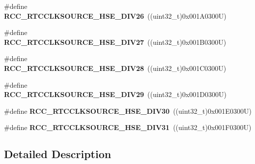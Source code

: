 \begin{DoxyCompactItemize}
\#define {\bfseries R\+C\+C\+\_\+\+R\+T\+C\+C\+L\+K\+S\+O\+U\+R\+C\+E\+\_\+\+H\+S\+E\+\_\+\+D\+I\+V26}~((uint32\+\_\+t)0x001\+A0300\+U)
\item 
\mbox{\label{group___r_c_c___r_t_c___clock___source_ga65afd29f069e2e9b607212876d7860e5}} 
\#define {\bfseries R\+C\+C\+\_\+\+R\+T\+C\+C\+L\+K\+S\+O\+U\+R\+C\+E\+\_\+\+H\+S\+E\+\_\+\+D\+I\+V27}~((uint32\+\_\+t)0x001\+B0300\+U)
\item 
\mbox{\label{group___r_c_c___r_t_c___clock___source_ga28e7a9291c903b820991c3a3e80c9ae1}} 
\#define {\bfseries R\+C\+C\+\_\+\+R\+T\+C\+C\+L\+K\+S\+O\+U\+R\+C\+E\+\_\+\+H\+S\+E\+\_\+\+D\+I\+V28}~((uint32\+\_\+t)0x001\+C0300\+U)
\item 
\mbox{\label{group___r_c_c___r_t_c___clock___source_gac22536498ea83e12ecd83f04d5e98858}} 
\#define {\bfseries R\+C\+C\+\_\+\+R\+T\+C\+C\+L\+K\+S\+O\+U\+R\+C\+E\+\_\+\+H\+S\+E\+\_\+\+D\+I\+V29}~((uint32\+\_\+t)0x001\+D0300\+U)
\item 
\mbox{\label{group___r_c_c___r_t_c___clock___source_ga5849760bab0f4057bd254cd022dc1a7a}} 
\#define {\bfseries R\+C\+C\+\_\+\+R\+T\+C\+C\+L\+K\+S\+O\+U\+R\+C\+E\+\_\+\+H\+S\+E\+\_\+\+D\+I\+V30}~((uint32\+\_\+t)0x001\+E0300\+U)
\item 
\mbox{\label{group___r_c_c___r_t_c___clock___source_ga074ac97804136221e39f50eb4cf13e3a}} 
\#define {\bfseries R\+C\+C\+\_\+\+R\+T\+C\+C\+L\+K\+S\+O\+U\+R\+C\+E\+\_\+\+H\+S\+E\+\_\+\+D\+I\+V31}~((uint32\+\_\+t)0x001\+F0300\+U)
\end{DoxyCompactItemize}


\subsection{Detailed Description}
